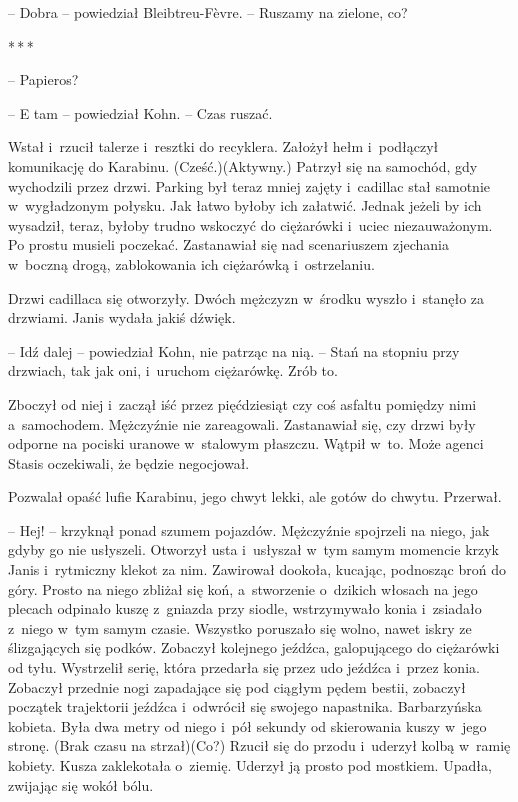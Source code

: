 \documentclass[oneside,polish,11pt,sfheadings]{mwbk}
\newcommand{\threeast}{\bigskip\par\centerline{*\,*\,*}\medskip\par}%
\begin{document}
-- Dobra -- powiedział Bleibtreu-Fèvre. -- Ruszamy na zielone, co?
  \threeast 

-- Papieros?

-- E tam -- powiedział Kohn. -- Czas ruszać.

Wstał i~rzucił talerze i~resztki do recyklera. Założył hełm i~podłączył
komunikację do Karabinu. (Cześć.)(Aktywny.) Patrzył się na samochód, gdy
wychodzili przez drzwi. Parking był teraz mniej zajęty i~cadillac stał
samotnie w~wygładzonym połysku. Jak łatwo byłoby ich załatwić. Jednak
jeżeli by ich wysadził, teraz, byłoby trudno wskoczyć do ciężarówki i~uciec niezauważonym. Po prostu musieli poczekać. Zastanawiał się nad
scenariuszem zjechania w~boczną drogą, zablokowania ich ciężarówką i~ostrzelaniu.

Drzwi cadillaca się otworzyły. Dwóch mężczyzn w~środku wyszło i~stanęło
za drzwiami. Janis wydała jakiś dźwięk.

-- Idź dalej -- powiedział Kohn, nie patrząc na nią. -- Stań na stopniu
przy drzwiach, tak jak oni, i~uruchom ciężarówkę. Zrób to.

Zboczył od niej i~zaczął iść przez pięćdziesiąt czy coś asfaltu pomiędzy
nimi a~samochodem. Mężczyźnie nie zareagowali. Zastanawiał się, czy
drzwi były odporne na pociski uranowe w~stalowym płaszczu. Wątpił w~to.
Może agenci Stasis oczekiwali, że będzie negocjował.

Pozwalał opaść lufie Karabinu, jego chwyt lekki, ale gotów do chwytu.
Przerwał.

-- Hej! -- krzyknął ponad szumem pojazdów. Mężczyźnie spojrzeli na niego,
jak gdyby go nie usłyszeli. Otworzył usta i~usłyszał w~tym samym
momencie krzyk Janis i~rytmiczny klekot za nim. Zawirował dookoła,
kucając, podnosząc broń do góry. Prosto na niego zbliżał się koń, a~stworzenie o~dzikich włosach na jego plecach odpinało kuszę z~gniazda
przy siodle, wstrzymywało konia i~zsiadało z~niego w~tym samym czasie.
Wszystko poruszało się wolno, nawet iskry ze ślizgających się podków.
Zobaczył kolejnego jeźdźca, galopującego do ciężarówki od tyłu.
Wystrzelił serię, która przedarła się przez udo jeźdźca i~przez konia.
Zobaczył przednie nogi zapadające się pod ciągłym pędem bestii, zobaczył
początek trajektorii jeźdźca i~odwrócił się swojego napastnika.
Barbarzyńska kobieta. Była dwa metry od niego i~pół sekundy od
skierowania kuszy w~jego stronę. (Brak czasu na strzał)(Co?) Rzucił się
do przodu i~uderzył kolbą w~ramię kobiety. Kusza zaklekotała o~ziemię.
Uderzył ją prosto pod mostkiem. Upadła, zwijając się wokół bólu.
\end{document}
